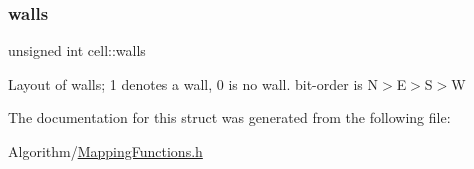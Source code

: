 \subsubsection{\texorpdfstring{walls}{walls}}
{\footnotesize\ttfamily unsigned int cell\+::walls}

Layout of walls; 1 denotes a wall, 0 is no wall. bit-\/order is N$>$E$>$S$>$W 

The documentation for this struct was generated from the following file\+:\begin{DoxyCompactItemize}
\item 
Algorithm/\hyperlink{MappingFunctions_8h}{Mapping\+Functions.\+h}\end{DoxyCompactItemize}
